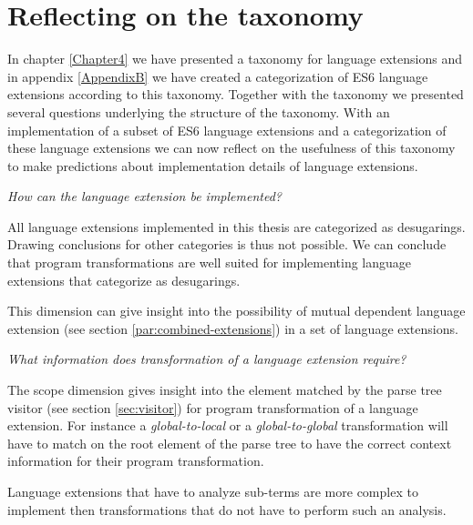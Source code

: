 
\section{Reflecting on the taxonomy}
In chapter \ref{Chapter4} we have presented a taxonomy for language extensions and in appendix \ref{AppendixB} we have created a categorization of ES6 language extensions according to this taxonomy. Together with the taxonomy we presented several questions underlying the structure of the taxonomy. With an implementation of a subset of ES6 language extensions and a categorization of these language extensions we can now reflect on the usefulness of this taxonomy to make predictions about implementation details of language extensions.

\textit{How can the language extension be implemented?}

\begin{description}[font=\normalfont,align=right,leftmargin=!, labelwidth=\widthof{Introduction of bindings},labelsep=2em]
	\item[Category] All language extensions implemented in this thesis are categorized as desugarings. Drawing conclusions for other categories is thus not possible. We can conclude that program transformations are well suited for implementing language extensions that categorize as desugarings.
	\item[Dependencies] This dimension can give insight into the possibility of mutual dependent language extension (see section \ref{par:combined-extensions}) in a set of language extensions.
\end{description}

\textit{What information does transformation of a language extension require?}

\begin{description}[font=\normalfont,align=right,leftmargin=!, labelwidth=\widthof{Introduction of bindings},labelsep=2em]
	\item[Scope] The scope dimension gives insight into the element matched by the parse tree visitor (see section \ref{sec:visitor}) for program transformation of a language extension. For instance a \textit{global-to-local} or a \textit{global-to-global} transformation will have to match on the root element of the parse tree to have the correct context information for their program transformation.
	\item[Analysis of subterms] Language extensions that have to analyze sub-terms are more complex to implement then transformations that do not have to perform such an analysis. 
\end{description}

